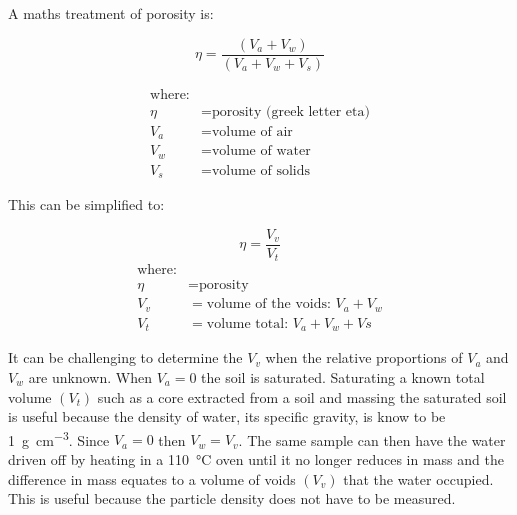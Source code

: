 \documentclass[letterpaper, 12pt]{article}
\begin{document}
\noindent\begin{minipage}{\textwidth}
A maths treatment of porosity is:

\begin{equation}
    \eta = \frac{\left(V_a + V_w\right)}{\left(V_a + V_w + V_s\right)}
\end{equation}

\begin{equation*}
    \begin{aligned}
        \text{where:}                              \\
        \eta &= \text{porosity (greek letter eta)} \\
        V_a &= \text{volume of air}                \\
        V_w &= \text{volume of water}              \\
        V_s &= \text{volume of solids}
    \end{aligned}
\end{equation*}
\end{minipage}

\noindent\begin{minipage}{\textwidth}
This can be simplified to:

\begin{equation}
    \eta = \frac{V_v}{V_t}
\end{equation}
\begin{equation*}
    \begin{aligned}
        \text{where:}                               \\
        \eta &= \text{porosity}                     \\
        V_v &= \text{volume of the voids}:\,V_a+V_w \\
        V_t &= \text{volume total}:\,V_a+V_w+Vs
    \end{aligned}
\end{equation*}
\end{minipage}

It can be challenging to determine the $V_v$ when the relative proportions of $V_a$ and $V_w$ are unknown. When $V_a = 0$ the soil is saturated. Saturating a known total volume $\left(V_t\right)$  such as a core extracted from a soil and massing the saturated soil is useful because the density of water, its specific gravity, is know to be \qty[per-mode = symbol]{1}{\gram\per\cubic\centi\metre}. Since $V_a=0$ then $V_w=V_v$. The same sample can then have the water driven off by heating in a \qty{110}{\degreeCelsius} oven until it no longer reduces in mass and the difference in mass equates to a volume of voids $\left(V_v\right)$ that the water occupied. This is useful because the particle density does not have to be measured.
\end{document}
